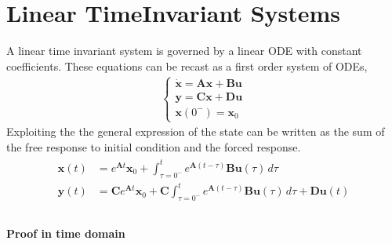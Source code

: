 \documentclass[letterpaper,10pt,english]{jupyterBook}
\begin{document}
\chapter{Linear Time\sphinxhyphen{}Invariant Systems}
\label{\detokenize{ch/ode/lti:linear-time-invariant-systems}}\label{\detokenize{ch/ode/lti:ode-lti}}\label{\detokenize{ch/ode/lti::doc}}
\sphinxAtStartPar
A linear time invariant system is governed by a linear ODE with constant coefficients. These equations can be recast as a first order system of ODEs,
\begin{equation*}
\begin{split}\begin{cases}
  \dot{\mathbf{x}} = \mathbf{A} \mathbf{x} + \mathbf{B} \mathbf{u} \\
       \mathbf{y}  = \mathbf{C} \mathbf{x} + \mathbf{D} \mathbf{u} \\
  \mathbf{x}(0^-) = \mathbf{x}_0
\end{cases}\end{split}
\end{equation*}
\sphinxAtStartPar
Exploiting the {\hyperref[\detokenize{ch/ode/lti:ode-lti-matrix-properties}]{}} the general expression of the state can be written as the sum of the free response to initial condition and the forced response.
\begin{equation*}
\begin{split}\begin{aligned}
  \mathbf{x}(t) & = e^{\mathbf{A}t} \mathbf{x}_0 + \int_{\tau=0^-}^{t} e^{\mathbf{A}(t-\tau)} \mathbf{B} \mathbf{u} (\tau) \, d \tau \\
  \mathbf{y}(t) & = \mathbf{C} e^{\mathbf{A}t} \mathbf{x}_0 + \mathbf{C} \int_{\tau=0^-}^{t} e^{\mathbf{A}(t-\tau)} \mathbf{B} \mathbf{u} (\tau) \, d \tau  + \mathbf{D} \mathbf{u}(t) \\
\end{aligned}\end{split}
\end{equation*}\subsubsection*{Proof in time domain}
\end{document}
